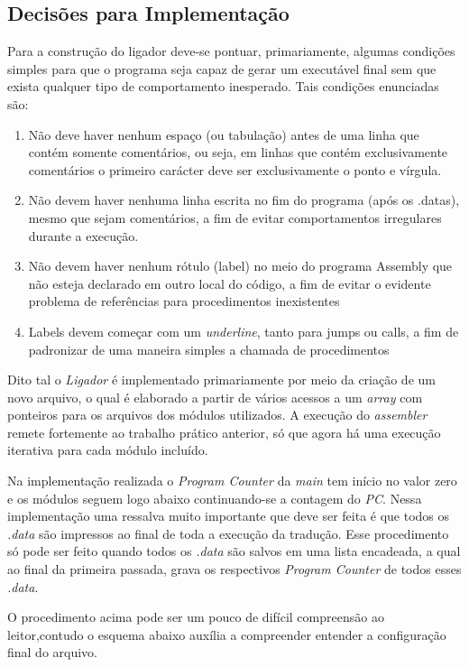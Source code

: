 \documentclass{article}
\begin{document}
\subsection{Decisões para Implementação}
Para a construção do ligador deve-se pontuar, primariamente, algumas condições simples para que o programa seja capaz de gerar um executável final sem que exista qualquer tipo de comportamento inesperado. Tais condições enunciadas são:

\begin{enumerate}
  \item Não deve haver nenhum espaço (ou tabulação) antes de uma linha que contém somente comentários, ou seja, em linhas que contém exclusivamente comentários o primeiro carácter deve ser exclusivamente o ponto e vírgula.
  \item Não devem haver nenhuma linha escrita no fim do programa (após os .datas), mesmo que sejam comentários, a fim de evitar comportamentos irregulares durante a execução.
  \item Não devem haver nenhum rótulo (label) no meio do programa Assembly que não esteja declarado em outro local do código, a fim de evitar o evidente problema de referências para procedimentos inexistentes
  \item Labels devem começar com um \textit{underline}, tanto para jumps ou calls, a fim de padronizar de uma maneira simples a chamada de procedimentos
\end{enumerate}

Dito tal o \textit{Ligador} é implementado primariamente por meio da criação de um novo arquivo, o qual é elaborado a partir de vários acessos a um \textit{array} com ponteiros para os arquivos dos módulos utilizados. A execução do \textit{assembler} remete fortemente ao trabalho prático anterior, só que agora há uma execução iterativa para cada módulo incluído.

Na implementação realizada o \textit{Program Counter} da \textit{main} tem início no valor zero e os módulos seguem logo abaixo continuando-se a contagem do \textit{PC}. Nessa implementação uma ressalva muito importante que deve ser feita é que todos os \textit{.data} são impressos ao final de toda a execução da tradução. Esse procedimento só pode ser feito quando todos os \textit{.data} são salvos em uma lista encadeada, a qual ao final da primeira passada, grava os respectivos \textit{Program Counter} de todos esses \textit{.data}.

O procedimento acima pode ser um pouco de difícil compreensão ao leitor,contudo o esquema abaixo auxília a compreender entender a configuração final do arquivo.
\end{document}
